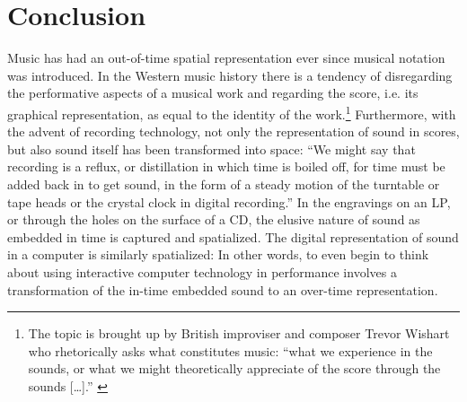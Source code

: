 \documentclass{article}
\begin{document}





\section{Conclusion}
\label{sec:conclusion}

Music has had an out-of-time spatial representation ever since musical notation was introduced. In the Western music history there is a tendency of disregarding the performative aspects of a musical work and regarding the score, i.e. its graphical representation, as equal to the identity of the work.\footnote{The topic is brought up by British improviser and composer Trevor Wishart who rhetorically asks what constitutes music: ``what we experience in the sounds, or what we might theoretically appreciate of the score through the sounds [\ldots].'' \cite{wis96}} Furthermore, with the advent of recording technology, not only the representation of sound in scores, but also sound itself has been transformed into space: ``We might say that recording is a reflux, or distillation in which time is boiled off, for time must be added back in to get sound, in the form of a steady motion of the turntable or tape heads or the crystal clock in digital recording.'' \citep[54]{evens05} In the engravings on an LP, or through the holes on the surface of a CD, the elusive nature of sound as embedded in time is captured and spatialized. The digital representation of sound in a computer is similarly spatialized: In other words, to even begin to think about using interactive computer technology in performance involves a transformation of the in-time embedded sound to an over-time representation.
\end{document}
